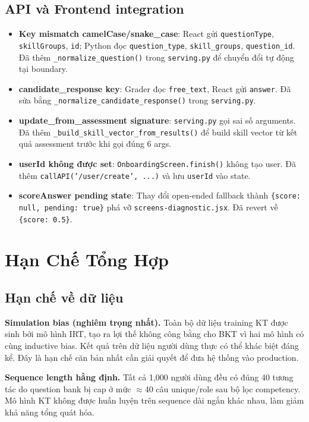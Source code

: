 \documentclass[12pt, a4paper]{report}
\begin{document}
\subsection{API và Frontend integration}
\begin{itemize}
  \item \textbf{Key mismatch camelCase/snake\_case}: React gửi \texttt{questionType}, \texttt{skillGroups}, \texttt{id}; Python đọc \texttt{question\_type}, \texttt{skill\_groups}, \texttt{question\_id}. Đã thêm \texttt{\_normalize\_question()} trong \texttt{serving.py} để chuyển đổi tự động tại boundary.
  \item \textbf{candidate\_response key}: Grader đọc \texttt{free\_text}, React gửi \texttt{answer}. Đã sửa bằng \texttt{\_normalize\_candidate\_response()} trong \texttt{serving.py}.
  \item \textbf{update\_from\_assessment signature}: \texttt{serving.py} gọi sai số arguments. Đã thêm \texttt{\_build\_skill\_vector\_from\_results()} để build skill vector từ kết quả assessment trước khi gọi đúng 6 args.
  \item \textbf{userId không được set}: \texttt{OnboardingScreen.finish()} không tạo user. Đã thêm \texttt{callAPI('/user/create', ...)} và lưu \texttt{userId} vào state.
  \item \textbf{scoreAnswer pending state}: Thay đổi open-ended fallback thành \texttt{\{score: null, pending: true\}} phá vỡ \texttt{screens-diagnostic.jsx}. Đã revert về \texttt{\{score: 0.5\}}.
\end{itemize}

\section{Hạn Chế Tổng Hợp}
\label{sec:limitations_summary}

\subsection{Hạn chế về dữ liệu}

\textbf{Simulation bias (nghiêm trọng nhất).} Toàn bộ dữ liệu training KT được sinh bởi mô hình IRT, tạo ra lợi thế không công bằng cho BKT vì hai mô hình có cùng inductive bias. Kết quả trên dữ liệu người dùng thực có thể khác biệt đáng kể. Đây là hạn chế căn bản nhất cần giải quyết để đưa hệ thống vào production.

\textbf{Sequence length hằng định.} Tất cả 1{,}000 người dùng đều có đúng 40 tương tác do question bank bị cap ở mức $\approx$40 câu unique/role sau bộ lọc competency. Mô hình KT không được huấn luyện trên sequence dài ngắn khác nhau, làm giảm khả năng tổng quát hóa.
\end{document}
